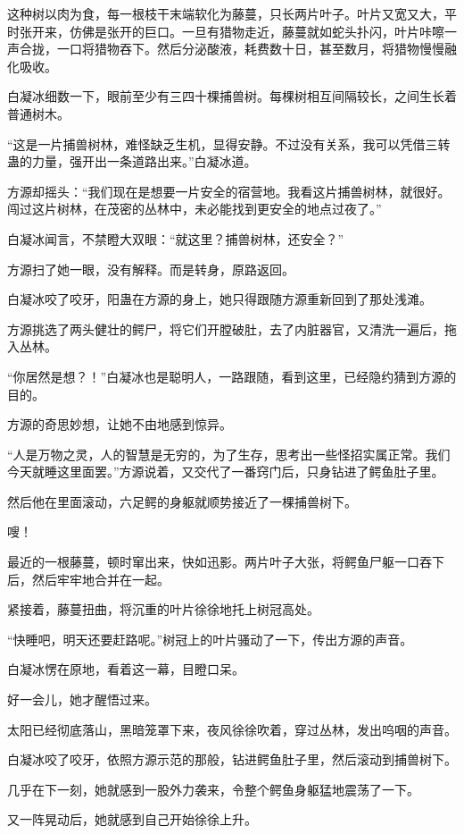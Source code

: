 \begin{this_body}
这种树以肉为食，每一根枝干末端软化为藤蔓，只长两片叶子。叶片又宽又大，平时张开来，仿佛是张开的巨口。一旦有猎物走近，藤蔓就如蛇头扑闪，叶片咔嚓一声合拢，一口将猎物吞下。然后分泌酸液，耗费数十日，甚至数月，将猎物慢慢融化吸收。

白凝冰细数一下，眼前至少有三四十棵捕兽树。每棵树相互间隔较长，之间生长着普通树木。

“这是一片捕兽树林，难怪缺乏生机，显得安静。不过没有关系，我可以凭借三转蛊的力量，强开出一条道路出来。”白凝冰道。

方源却摇头：“我们现在是想要一片安全的宿营地。我看这片捕兽树林，就很好。闯过这片树林，在茂密的丛林中，未必能找到更安全的地点过夜了。”

白凝冰闻言，不禁瞪大双眼：“就这里？捕兽树林，还安全？”

方源扫了她一眼，没有解释。而是转身，原路返回。

白凝冰咬了咬牙，阳蛊在方源的身上，她只得跟随方源重新回到了那处浅滩。

方源挑选了两头健壮的鳄尸，将它们开膛破肚，去了内脏器官，又清洗一遍后，拖入丛林。

“你居然是想？！”白凝冰也是聪明人，一路跟随，看到这里，已经隐约猜到方源的目的。

方源的奇思妙想，让她不由地感到惊异。

“人是万物之灵，人的智慧是无穷的，为了生存，思考出一些怪招实属正常。我们今天就睡这里面罢。”方源说着，又交代了一番窍门后，只身钻进了鳄鱼肚子里。

然后他在里面滚动，六足鳄的身躯就顺势接近了一棵捕兽树下。

嗖！

最近的一根藤蔓，顿时窜出来，快如迅影。两片叶子大张，将鳄鱼尸躯一口吞下后，然后牢牢地合并在一起。

紧接着，藤蔓扭曲，将沉重的叶片徐徐地托上树冠高处。

“快睡吧，明天还要赶路呢。”树冠上的叶片骚动了一下，传出方源的声音。

白凝冰愣在原地，看着这一幕，目瞪口呆。

好一会儿，她才醒悟过来。

太阳已经彻底落山，黑暗笼罩下来，夜风徐徐吹着，穿过丛林，发出呜咽的声音。

白凝冰咬了咬牙，依照方源示范的那般，钻进鳄鱼肚子里，然后滚动到捕兽树下。

几乎在下一刻，她就感到一股外力袭来，令整个鳄鱼身躯猛地震荡了一下。

又一阵晃动后，她就感到自己开始徐徐上升。


\end{this_body}
